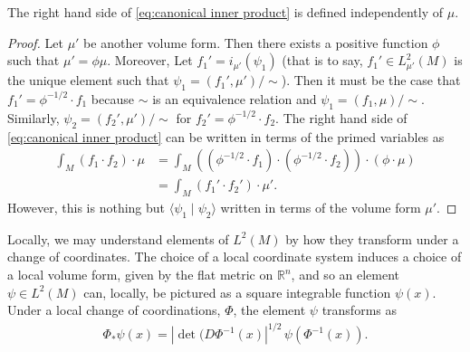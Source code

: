 \documentclass[final,leqno]{siamart}
\begin{document}
\begin{proposition}
	The right hand side of \eqref{eq:canonical inner product} is defined independently of $\mu$.
\end{proposition}
\begin{proof}
	Let $\mu'$ be another volume form.
	Then there exists a positive function $\phi$ such that $\mu' = \phi \mu$.
	Moreover, Let $f_1' = i_{\mu'}( \psi_1)$ (that is to say, $f_1' \in L^2_{\mu'}(M)$ is the unique element such that $\psi_1 = (  f_1', \mu' ) / \sim$).
	Then it must be the case that $f_1' = \phi^{-1/2} \cdot f_1$ because $\sim$ is an equivalence relation and $\psi_1 = (f_1,\mu) / \sim$.
	Similarly, $\psi_2 = ( f_2', \mu' ) / \sim$ for $f_2' = \phi^{-1/2} \cdot f_2$.
	The right hand side of \eqref{eq:canonical inner product} can be written in terms of the primed variables as
	\begin{align*}
		\int_M (f_1 \cdot f_2) \cdot \mu &= \int_M ( (\phi^{-1/2} \cdot f_1) \cdot (\phi^{-1/2} \cdot f_2) ) \cdot (\phi \cdot \mu) \\
			&= \int_M ( f_1' \cdot f_2') \cdot \mu'.
	\end{align*}
	However, this is nothing but $\langle \psi_1 \mid \psi_2 \rangle$ written in terms of the volume form $\mu'$.
\end{proof}

Locally, we may understand elements of $L^2(M)$ by how they transform under a change of coordinates.
The choice of a local coordinate system induces a choice of a local volume form, given by the flat metric on $\mathbb{R}^n$,
and so an element $\psi \in L^2(M)$ can, locally, be pictured as a square integrable function $\psi(x)$.
Under a local change of coordinations, $\Phi$, the element $\psi$ transforms as
\begin{align}
	\Phi_*\psi(x) = | \det( D\Phi^{-1}(x) |^{1/2} \, \psi( \Phi^{-1}(x) ). \label{eq:coordinate transformation}
\end{align}
\end{document}
